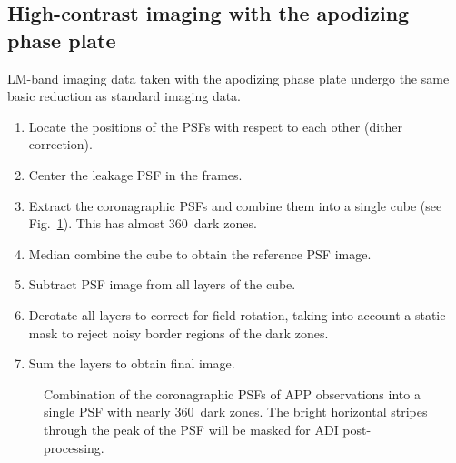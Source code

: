 \subsection{High-contrast imaging with the apodizing phase plate}
\label{ssec:algo_app_imaging}

LM-band imaging data taken with the apodizing phase plate undergo the
same basic reduction as standard imaging data. 



\begin{enumerate}
\item Locate the positions of the PSFs with respect to each other
  (dither correction).
\item Center the leakage PSF in the frames.
\item Extract the coronagraphic PSFs and combine them into a single
  cube (see Fig.~\ref{fig:app_psf_combine}). This has almost
  360\degr\ dark zones.
\item Median combine the cube to obtain the reference PSF image.
\item Subtract PSF image from all layers of the cube.
\item Derotate all layers to correct for field rotation, taking into
  account a static mask to reject noisy border regions of the dark
  zones.
\item Sum the layers to obtain final image.
\end{enumerate}

\begin{figure}
  \centering
  \caption{Combination of the coronagraphic PSFs of APP observations
    into a single PSF with nearly 360\degr\ dark zones. The bright
    horizontal stripes through the peak of the PSF will be masked for
    ADI post-processing.}
  \label{fig:app_psf_combine}
\end{figure}


